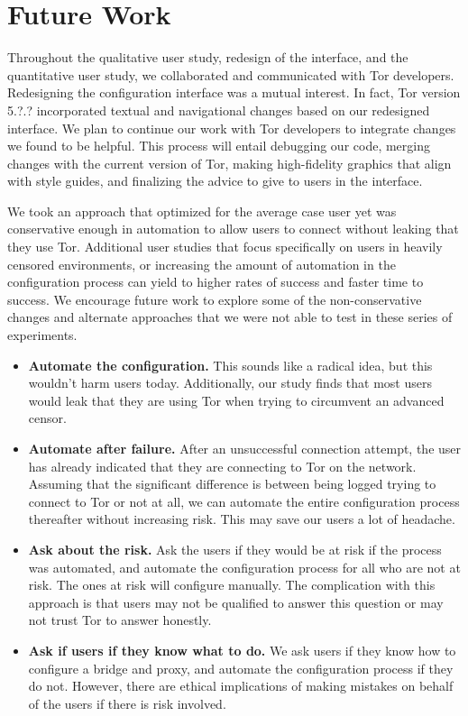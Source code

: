 \documentclass[USenglish,oneside,twocolumn]{article}
\begin{document}
\section{Future Work} 
Throughout the qualitative user study, redesign of the interface, and the quantitative user study, we collaborated and communicated with Tor developers. Redesigning the configuration interface was a mutual interest. In fact, Tor version {\color{red} 5.?.?} incorporated textual and navigational changes based on our redesigned interface. We plan to continue our work with Tor developers to integrate changes we found to be helpful. This process will entail debugging our code, merging changes with the current version of Tor, making high-fidelity graphics that align with style guides, and finalizing the advice to give to users in the interface. 

We took an approach that optimized for the average case user yet was conservative enough in automation to allow users to connect without leaking that they use Tor. Additional user studies that focus specifically on users in heavily censored environments, or increasing the amount of automation in the configuration process can yield to higher rates of success and faster time to success. We encourage future work to explore some of the non-conservative changes and alternate approaches that we were not able to test in these series of experiments.\\

\begin{itemize}
\item{\bfseries Automate the configuration.} This sounds like a radical idea, but this wouldn't harm users today. Additionally, our study finds that most users would leak that they are using Tor when trying to circumvent an advanced censor. 
\item {\bfseries Automate after failure.} After an unsuccessful connection attempt, the user has already indicated that they are connecting to Tor on the network. Assuming that the significant difference is between being logged trying to connect to Tor or not at all, we can automate the entire configuration process thereafter without increasing risk. This may save our users a lot of headache. 
\item{\bfseries Ask about the risk.} Ask the users if they would be at risk if the process was automated, and automate the configuration process for all who are not at risk. The ones at risk will configure manually. The complication with this approach is that users may not be qualified to answer this question or may not trust Tor to answer honestly. 
\item{\bfseries Ask if users if they know what to do.} We ask users if they know how to configure a bridge and proxy, and automate the configuration process if they do not. However, there are ethical implications of making mistakes on behalf of the users if there is risk involved. 
\end{itemize}
\end{document}
